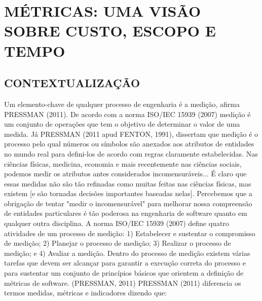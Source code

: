 \chapter*[MÉTRICAS: UMA VISÃO SOBRE CUSTO, ESCOPO E TEMPO]{MÉTRICAS: UMA VISÃO SOBRE CUSTO, ESCOPO E TEMPO}

\section{CONTEXTUALIZAÇÃO}
Um elemento-chave de qualquer processo de engenharia é a medição, afirma PRESSMAN (2011). De acordo com a norma ISO/IEC 15939 (2007) medição é um conjunto de operações que tem o objetivo de determinar o valor de uma medida. Já PRESSMAN (2011 apud FENTON, 1991), dissertam que medição é o processo pelo qual números ou símbolos são anexados aos atributos de entidades no mundo real para defini-los de acordo com regras claramente estabelecidas. Nas ciências físicas, medicina, economia e mais recentemente nas ciências sociais, podemos medir os atributos antes considerados incomensuráveis... É claro que essas medidas não são tão refinadas como muitas feitas nas ciências físicas, mas existem [e são tornadas decisões importantes baseadas nelas]. Percebemos que a obrigação de tentar "medir o incomensurável" para melhorar nossa compreensão de entidades particulares é tão poderosa na engenharia de software quanto em qualquer outra disciplina.
A norma ISO/IEC 15939 (2007) define quatro atividades de um processo de medição: 1) Estabelecer e sustentar o compromisso de medição; 2) Planejar o processo de medição; 3) Realizar o processo de medição; e 4) Avaliar a medição. Dentro do processo de medição existem várias tarefas que devem ser alcançar para garantir a execução correta do processo e para sustentar um conjunto de princípios básicos que orientem a definição de métricas de software. (PRESSMAN, 2011)
PRESSMAN (2011) diferencia os termos medidas, métricas e indicadores dizendo que: 
